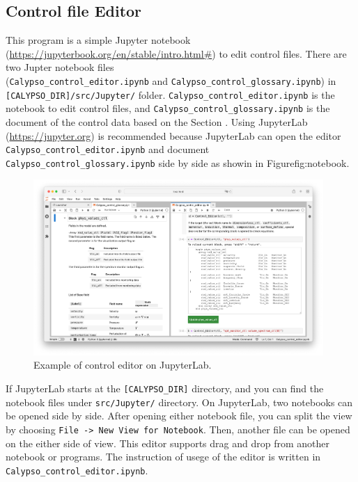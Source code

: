 \subsection{Control file Editor}
This program is a simple Jupyter notebook (\url{https://jupyterbook.org/en/stable/intro.html#}) to edit control files. There are two Jupter notebook files \\
(\verb|Calypso_control_editor.ipynb| and \verb|Calypso_control_glossary.ipynb|) in \verb|[CALYPSO_DIR]/src/Jupyter/| folder. \verb|Calypso_control_editor.ipynb| is the notebook to edit control files, and \verb|Calypso_control_glossary.ipynb| is the document of the control data based on the Section \label{section:def_control}. Using JupyterLab (\url{https://jupyter.org}) is recommended because JupyterLab can open the editor \\
\verb|Calypso_control_editor.ipynb| and document \\
\verb|Calypso_control_glossary.ipynb| side by side as showin in Figure{fig:notebook}.
%
\begin{figure}[htbp]
\begin{center}
\includegraphics*[width=110mm]{Images/Editor_notebook}
\end{center}
\caption{Example of control editor on JupyterLab.}
\label{fig:notebook}
\end{figure}
%

If JupyterLab starts at the \verb|[CALYPSO_DIR]| directory, and you can find the notebook files under \verb|src/Jupyter/| directory. On JupyterLab, two notebooks can be opened side by side. After opening either notebook file, you can split the view by choosing \verb|File -> New View for Notebook|. Then, another file can be opened on the either side of view. This editor supports drag and drop from another notebook or programs. The instruction of usege of the editor is written in \\
     \verb|Calypso_control_editor.ipynb|.


